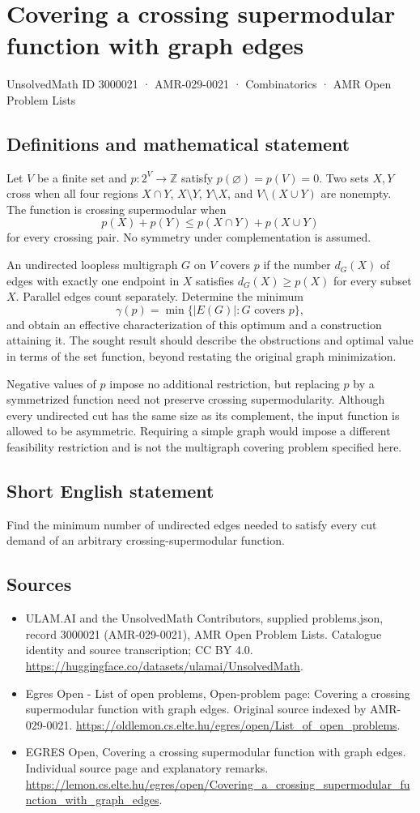 \documentclass[11pt,a4paper]{article}
\begin{document}
\section*{Covering a crossing supermodular function with graph edges}\label{3000021}
{\small UnsolvedMath ID 3000021 · AMR-029-0021 · Combinatorics · AMR Open Problem Lists}
\subsection{Definitions and mathematical statement}
Let $V$ be a finite set and $p:2^V\to\mathbb Z$ satisfy
$p(\varnothing)=p(V)=0$. Two sets $X,Y$ cross when all four regions
$X\cap Y$, $X\setminus Y$, $Y\setminus X$, and $V\setminus(X\cup Y)$
are nonempty. The function is crossing supermodular when
\[
                     p(X)+p(Y)\le p(X\cap Y)+p(X\cup Y)
\]
for every crossing pair. No symmetry under complementation is assumed.

An undirected loopless multigraph $G$ on $V$ covers $p$ if the number
$d_G(X)$ of edges with exactly one endpoint in $X$ satisfies
$d_G(X)\ge p(X)$ for every subset $X$. Parallel edges count separately.
Determine the minimum
\[
             \gamma(p)=\min\{|E(G)|:G\text{ covers }p\},
\]
and obtain an effective characterization of this optimum and a
construction attaining it. The sought result should describe the
obstructions and optimal value in terms of the set function, beyond
restating the original graph minimization.

Negative values of $p$ impose no additional restriction, but replacing
$p$ by a symmetrized function need not preserve crossing supermodularity.
Although every undirected cut has the same size as its complement,
the input function is allowed to be asymmetric. Requiring a simple
graph would impose a different feasibility restriction and is not
the multigraph covering problem specified here.
\subsection{Short English statement}
Find the minimum number of undirected edges needed to satisfy
every cut demand of an arbitrary crossing-supermodular function.
\subsection{Sources}
\begin{itemize}
\item[S1] ULAM.AI and the UnsolvedMath Contributors, supplied problems.json, record 3000021 (AMR-029-0021), AMR Open Problem Lists. Catalogue identity and source transcription; CC BY 4.0.
\url{https://huggingface.co/datasets/ulamai/UnsolvedMath}.
\item[S2] Egres Open - List of open problems, Open-problem page: Covering a crossing supermodular function with graph edges. Original source indexed by AMR-029-0021.
\url{https://oldlemon.cs.elte.hu/egres/open/List_of_open_problems}.
\item[S3] EGRES Open, Covering a crossing supermodular function with graph edges. Individual source page and explanatory remarks.
\url{https://lemon.cs.elte.hu/egres/open/Covering_a_crossing_supermodular_function_with_graph_edges}.
\end{itemize}
\end{document}
